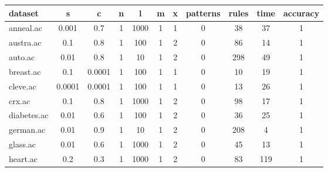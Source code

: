 \begin{table}[htbp]
	\centering
		\begin{tabular}{|l|c|c|c|c|c|c|c|c|c|c|}
		\hline
		\textbf{dataset}	& \textbf{s}	& \textbf{c}	& \textbf{n}	& \textbf{l}	& \textbf{m}	& \textbf{x}	& \textbf{patterns}	& \textbf{rules}	& \textbf{time}	& \textbf{accuracy}	\\
		\hline
		anneal.ac      & 0.001    & 0.7         & 1              & 1000                & 1             & 1             & 0              & 38             & 37             & 1              \\
		\hline
		austra.ac      & 0.1      & 0.8         & 1              & 100                 & 1             & 2             & 0              & 86             & 14             & 1              \\
		\hline
		auto.ac        & 0.01     & 0.8         & 1              & 10                  & 1             & 2             & 0              & 298            & 49             & 1              \\
		\hline
		breast.ac      & 0.1      & 0.0001      & 1              & 100                 & 1             & 1             & 0              & 10             & 19             & 1              \\
		\hline
		cleve.ac       & 0.0001   & 0.0001      & 1              & 100                 & 1             & 1             & 0              & 13             & 26             & 1              \\
		\hline
		crx.ac         & 0.1      & 0.8         & 1              & 1000                & 1             & 2             & 0              & 98             & 17             & 1              \\
		\hline
		diabetes.ac    & 0.01     & 0.6         & 1              & 100                 & 1             & 2             & 0              & 36             & 25             & 1              \\
		\hline
		german.ac      & 0.01     & 0.9         & 1              & 10                  & 1             & 2             & 0              & 208            & 4              & 1              \\
		\hline
		glass.ac       & 0.01     & 0.6         & 1              & 1000                & 1             & 2             & 0              & 45             & 13             & 1              \\
		\hline
		heart.ac       & 0.2      & 0.3         & 1              & 1000                & 1             & 2             & 0              & 83             & 119            & 1              \\

\end{tabular}
\end{table}
